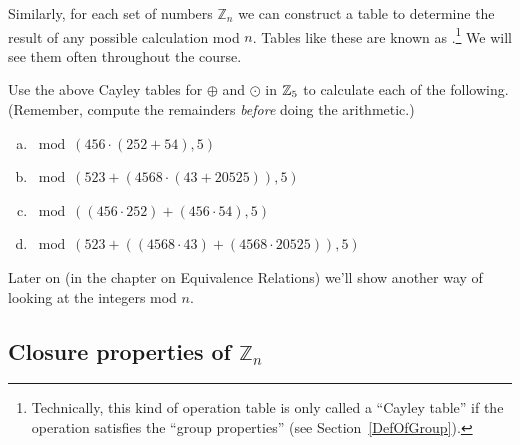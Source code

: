 Similarly, for each set of numbers ${\mathbb Z}_n$ we can construct a table to determine the result of any possible calculation mod $n$.
Tables like these are  known as .\footnote{Technically, this kind of operation table is only called a ``Cayley table'' if the operation satisfies the ``group properties'' (see Section~\ref{DefOfGroup}). }  We will see them often throughout the course.

\begin{exercise}{49}
Use the above Cayley tables for $\oplus$ and $\odot$  in $\mathbb{Z}_5$ to calculate each of the following.  (Remember, compute the remainders \emph{before} doing the arithmetic.)

\begin{enumerate}[(a)]
\item
$ \bmod(456 \cdot (252 + 54),5) $
\item
$ \bmod(523 + \left( 4568 \cdot (43 + 20525) \right),5)$
\item
$\bmod((456 \cdot 252) + (456 \cdot 54),5) $
\item
$ \bmod(523 + \left( (4568 \cdot 43) + (4568 \cdot 20525) \right) ,5)$
\end{enumerate}
\end{exercise}



\noindent
Later on (in the chapter on Equivalence Relations) we'll show another way of looking at the integers mod $n$.

\subsection{Closure properties of ${\mathbb Z}_n$}\label{sec:ClosureZn}

